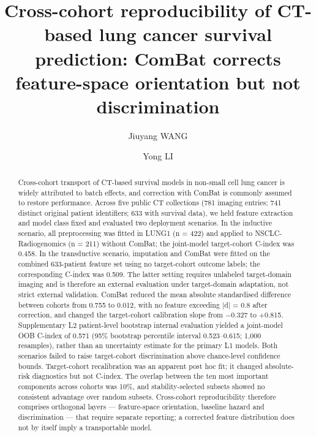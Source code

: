 \documentclass[a4paper,fleqn]{cas-sc}
\begin{document}
\let\WriteBookmarks\relax
\def\floatpagepagefraction{1}
\def\textpagefraction{.001}

\title[mode=title]{Cross-cohort reproducibility of CT-based lung cancer survival prediction:
ComBat corrects feature-space orientation but not discrimination}

\author[1]{Jiuyang WANG}
\fnmark[1]

\author[1]{Yong LI}
\cormark[1]

\begin{abstract}
Cross-cohort transport of CT-based survival models in non-small cell lung cancer is widely attributed to batch effects, and correction with ComBat is commonly assumed to restore performance. Across five public CT collections (781 imaging entries; 741 distinct original patient identifiers; 633 with survival data), we held feature extraction and model class fixed and evaluated two deployment scenarios. In the inductive scenario, all preprocessing was fitted in LUNG1 (n = 422) and applied to NSCLC-Radiogenomics (n = 211) without ComBat; the joint-model target-cohort C-index was 0.458. In the transductive scenario, imputation and ComBat were fitted on the combined 633-patient feature set using no target-cohort outcome labels; the corresponding C-index was 0.509. The latter setting requires unlabeled target-domain imaging and is therefore an external evaluation under target-domain adaptation, not strict external validation. ComBat reduced the mean absolute standardised difference between cohorts from 0.755 to 0.012, with no feature exceeding |d| = 0.8 after correction, and changed the target-cohort calibration slope from $-$0.327 to +0.815. Supplementary L2 patient-level bootstrap internal evaluation yielded a joint-model OOB C-index of 0.571 (95\% bootstrap percentile interval 0.523--0.615; 1,000 resamples), rather than an uncertainty estimate for the primary L1 models. Both scenarios failed to raise target-cohort discrimination above chance-level confidence bounds. Target-cohort recalibration was an apparent post hoc fit; it changed absolute-risk diagnostics but not C-index. The overlap between the ten most important components across cohorts was 10\%, and stability-selected subsets showed no consistent advantage over random subsets. Cross-cohort reproducibility therefore comprises orthogonal layers --- feature-space orientation, baseline hazard and discrimination --- that require separate reporting; a corrected feature distribution does not by itself imply a transportable model.
\end{abstract}
\end{document}
